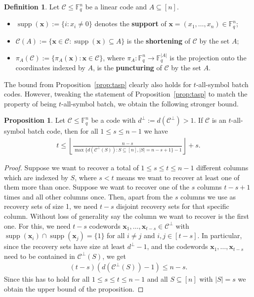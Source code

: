 \documentclass[11pt,a4paper]{article}
\theoremstyle{definition}
\newtheorem{proposition}[theorem]{Proposition}
\newtheorem{definition}[theorem]{Definition}
\newcommand{\bfx}{{\boldsymbol x}}
\newcommand{\F}{\mathbb{F}}
\newcommand{\mC}{\mathcal{C}}
\newcommand{\supp}{\operatorname{supp}}
\begin{document}
\begin{definition} \label{short/punct}
    Let $\mC \leq \F_q^n$ be a linear code and $A \subseteq [n]$. 
    \begin{itemize}
        \item[(i)] $\supp(\bfx):=\{i : x_i \ne 0\}$ denotes the \textbf{support} of $\bfx=(x_1,\dots,x_n) \in \F_q^n$;
        \item[(ii)] $\mC(A):=\{\bfx \in \mC : \supp(\bfx) \subseteq A\}$ is the \textbf{shortening} of $\mC$ by the set $A$;
        \item[(iii)] $\pi_{A}(\mC):=\{\pi_{A}(\bfx) : \bfx \in \mC\}$, where $\pi_A:\F_q^n \to \F_q^{|A|}$ is the projection onto the coordinates indexed by $A$, is the \textbf{puncturing} of $\mC$ by the set $A$.
    \end{itemize}
\end{definition}

The bound from Proposition~\ref{prop:tasp} clearly also holds for $t$-all-symbol batch codes. However, tweaking the statement of Proposition~\ref{prop:tasp} to match the property of being $t$-all-symbol batch, we obtain the following stronger bound.


\begin{proposition}\label{cor:tasb}
Let $\mC \le \F_q^n$ be a code with $d^\perp:=d(\mC^\perp) >1$. If $\mC$ is an $t$-all-symbol batch code, then for all $1 \le s \le n-1$ we have
\begin{align*}
        t \le \left\lfloor\frac{n-s}{\max\{d(\mC^\perp(S)) : S \subseteq [n], |S|=n-s+1\}-1}\right\rfloor+s.
    \end{align*}
\end{proposition}

\begin{proof}
Suppose we want to recover a total of $1 \le s \le t \le n-1$ different columns which are indexed by $S$, where $s < t$ means we want to recover at least one of them more than once. Suppose we want to recover one of the $s$ columns $t-s+1$ times and all other columns once. Then, apart from the $s$ columns we use as recovery sets of size 1, we need $t-s$ disjoint recovery sets for that specific column. Without loss of generality say the column we want to recover is the first one. For this, we need $t-s$ codewords $\bfx_1,\dots,\bfx_{t-s} \in \mC^\perp$ with $\supp(\bfx_i) \cap \supp(\bfx_j) = \{1\}$ for all $i \ne j$ and $i,j \in [t-s]$. In particular, since the recovery sets have size at least $d^\perp-1$, and the codewords $\bfx_1,\dots,\bfx_{t-s}$ need to be contained in $\mC^\perp(S)$, we get
\begin{align*}
    (t-s)\left(d(\mC^\perp(S))-1\right) \le n-s.
\end{align*}
Since this has to hold for all $1 \le s \le t \le n-1$ and all $S \subseteq [n]$ with $|S|=s$ we obtain the upper bound of the proposition.
\end{proof}
\end{document}
